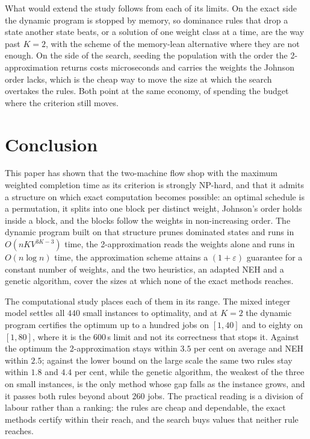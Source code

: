 \documentclass[12pt]{article}
\let\origsection\section
\renewcommand{\section}{\FloatBarrier\origsection}
\begin{document}
\begin{sloppypar}
        What would extend the study follows from each of its limits. On the exact side the dynamic program
        is stopped by memory, so dominance rules that drop a state another state beats, or a solution of
        one weight class at a time, are the way past $K=2$, with the scheme of  the
        memory-lean alternative where they are not enough. On the side of the search, seeding the
        population with the order the 2-approximation returns costs microseconds and carries the weights
        the Johnson order lacks, which is the cheap way to move the size at which the search overtakes the
        rules. Both point at the same economy, of spending the budget where the criterion still moves.
        
        \FloatBarrier
        \clearpage
        
        \section{Conclusion}
        \label{sec:conclusion}
        
        This paper has shown that the two-machine flow shop with the maximum weighted completion time as
        its criterion is strongly NP-hard, and that it admits a structure on which exact computation
        becomes possible: an optimal schedule is a permutation, it splits into one block per distinct
        weight, Johnson's order holds inside a block, and the blocks follow the weights in non-increasing
        order. The dynamic program built on that structure prunes dominated states and runs in
        $O(nKV^{3K-3})$ time, the 2-approximation reads the weights alone and runs in $O(n\log n)$ time,
        the approximation scheme attains a $(1+\varepsilon)$ guarantee for a constant number of weights,
        and the two heuristics, an adapted NEH and a genetic algorithm, cover the sizes at which none of
        the exact methods reaches.
        
        The computational study places each of them in its range. The mixed integer model settles all
        $440$ small instances to optimality, and at $K=2$ the dynamic program certifies the optimum up to a
        hundred jobs on $[1,40]$ and to eighty on $[1,80]$, where it is the $600$\,s limit and not its
        correctness that stops it. Against the optimum the 2-approximation stays within $3.5$ per cent on
        average and NEH within $2.5$; against the lower bound on the large scale the same two rules stay
        within $1.8$ and $4.4$ per cent, while the genetic algorithm, the weakest of the three on small
        instances, is the only method whose gap falls as the instance grows, and it passes both rules
        beyond about $260$ jobs. The practical reading is a division of labour rather than a ranking: the
        rules are cheap and dependable, the exact methods certify within their reach, and the search buys
        values that neither rule reaches.
        

\end{sloppypar}
\end{document}
